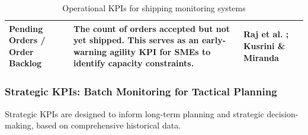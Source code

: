 \documentclass{imc-inf}
\begin{document}
\begin{table}[!htbp]
\begin{tabular}{@{}>{\raggedright\arraybackslash}p{4cm}p{8cm}>{\raggedright\arraybackslash}p{3cm}@{}}
    Pending Orders / Order Backlog                                                                                                                                                                                                                                                                                                             &
    The count of orders accepted but not yet shipped. This serves as an early-warning agility KPI for SMEs to identify capacity constraints.                                                                                                                                                                                                   &
    Raj et al. \cite{rajStochasticModelingIntegrated2024}; Kusrini \& Miranda \cite{kusriniDeterminingPerformanceMetrics2021}                                                                                                                                                                                                                                                           \\[6pt]

    \bottomrule
  \end{tabular}
  \caption{Operational KPIs for shipping monitoring systems}
  \label{tab:operational-kpis}
\end{table}

\subsubsection{Strategic KPIs: Batch Monitoring for Tactical Planning}
Strategic KPIs are designed to inform long-term planning and strategic decision-making, based on comprehensive historical data.
\end{document}
